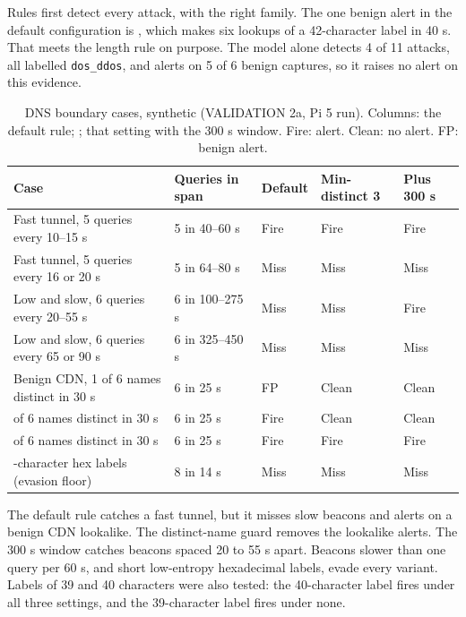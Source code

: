 Rules first detect every attack, with the right family. The one benign alert in the default configuration is , which makes six lookups of a 42-character label in 40 s. That meets the length rule on purpose. The model alone detects 4 of 11 attacks, all labelled \texttt{dos\_ddos}, and alerts on 5 of 6 benign captures, so it raises no alert on this evidence.

\begin{table}[t]
\centering
\caption{DNS boundary cases, synthetic (VALIDATION 2a, Pi 5 run). Columns: the default rule; ; that setting with the 300 s window. Fire: alert. Clean: no alert. FP: benign alert.}\label{tab:dns}
\footnotesize
\setlength{\tabcolsep}{3pt}
\begin{tabularx}{\linewidth}{>{\raggedright\arraybackslash}p{6.2cm}p{2.9cm}p{1.6cm}p{2.0cm}p{2.1cm}}
\toprule
Case & Queries in span & Default & Min-distinct 3 & Plus 300 s \\
\midrule
Fast tunnel, 5 queries every 10--15 s & 5 in 40--60 s & Fire & Fire & Fire \\
Fast tunnel, 5 queries every 16 or 20 s & 5 in 64--80 s & Miss & Miss & Miss \\
Low and slow, 6 queries every 20--55 s & 6 in 100--275 s & Miss & Miss & Fire \\
Low and slow, 6 queries every 65 or 90 s & 6 in 325--450 s & Miss & Miss & Miss \\
Benign CDN, 1 of 6 names distinct in 30 s & 6 in 25 s & FP & Clean & Clean \\
2 of 6 names distinct in 30 s & 6 in 25 s & Fire & Clean & Clean \\
3 of 6 names distinct in 30 s & 6 in 25 s & Fire & Fire & Fire \\
24-character hex labels (evasion floor) & 8 in 14 s & Miss & Miss & Miss \\
\bottomrule
\end{tabularx}
\end{table}

The default rule catches a fast tunnel, but it misses slow beacons and alerts on a benign CDN lookalike. The distinct-name guard removes the lookalike alerts. The 300 s window catches beacons spaced 20 to 55 s apart. Beacons slower than one query per 60 s, and short low-entropy hexadecimal labels, evade every variant. Labels of 39 and 40 characters were also tested: the 40-character label fires under all three settings, and the 39-character label fires under none.

